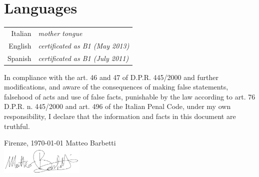 \documentclass[a4, 11pt]{report}
\begin{document}
    \vskip 9mm

    \section*{Languages}
        \begin{tabular}{rl}
            Italian & {\small \emph {mother tongue}}\\
            English & {\small \emph {certificated as B1 (May 2013)}}\\
            Spanish & {\small \emph {certificated as B1 (July 2011)}}
        \end{tabular}

    \vskip 15mm

    \noindent
    {\small In compliance with the art. 46 and 47 of D.P.R. 445/2000 and further modifications, and aware of the consequences of making 
    false statements, falsehood of acts and use of false facts, punishable by the law according to art. 76 D.P.R. n. 445/2000
    and art. 496 of the Italian Penal Code, under my own responsibility, I declare that the information and facts in this document
    are truthful.}
  
    \vskip 6mm 
  
    \noindent
    {\small Firenze, \today}
    \hfill {\small Matteo Barbetti}\\ [3mm]
    \null \hfill \includegraphics[width=0.30\textwidth]{academic-cv/main/img/signature.png}
  
\end{document}

